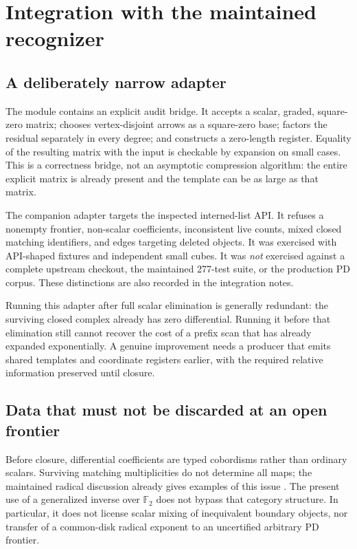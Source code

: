 \documentclass[11pt,letterpaper]{article}
\newcommand{\F}{{\mathbb F_2}}
\newcommand{\code}[1]{\texttt{\detokenize{#1}}}
\theoremstyle{definition}
\theoremstyle{remark}
\numberwithin{equation}{section}
\begin{document}
\section{Integration with the maintained recognizer}
\label{sec:integration}

\subsection{A deliberately narrow adapter}
The module \code{portkh.explicit} contains an explicit audit bridge. It
accepts a scalar, graded, square-zero matrix; chooses vertex-disjoint
arrows as a square-zero base; factors the residual separately in every
degree; and constructs a zero-length register. Equality of the resulting
matrix with the input is checkable by expansion on small cases.
This is a correctness bridge, not an asymptotic compression algorithm:
the entire explicit matrix is already present and the template can be
as large as that matrix.

The companion \code{from_closed_fastscan} adapter targets the inspected
interned-list API. It refuses a nonempty frontier, non-scalar coefficients,
inconsistent live counts, mixed closed matching identifiers, and edges
targeting deleted objects. It was exercised with API-shaped fixtures and
independent small cubes. It was \emph{not} exercised against a complete
upstream checkout, the maintained 277-test suite, or the production PD
corpus. These distinctions are also recorded in the integration notes.

Running this adapter after full scalar elimination is generally redundant:
the surviving closed complex already has zero differential. Running it
before that elimination still cannot recover the cost of a prefix scan
that has already expanded exponentially. A genuine improvement needs a
producer that emits shared templates and coordinate registers earlier,
with the required relative information preserved until closure.

\subsection{Data that must not be discarded at an open frontier}
Before closure, differential coefficients are typed cobordisms rather than
ordinary scalars. Surviving matching multiplicities do not determine all
maps; the maintained radical discussion already gives examples of this
issue \cite{repo-radical}. The present use of a generalized inverse over
$\F$ does not bypass that category structure. In particular, it does not
license scalar mixing of inequivalent boundary objects, nor transfer of
a common-disk radical exponent to an uncertified arbitrary PD frontier.
\end{document}
